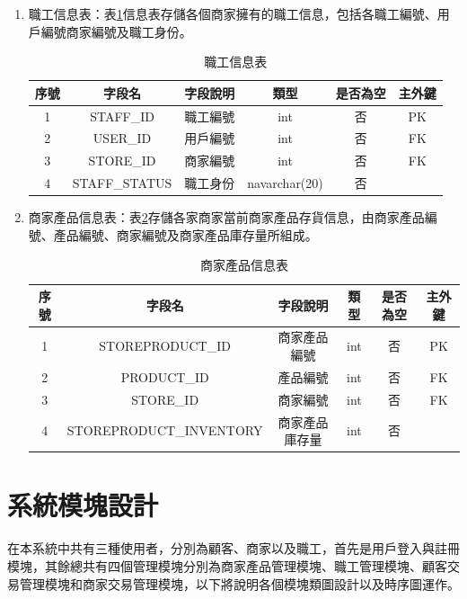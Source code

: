 \begin{enumerate}
		\item 職工信息表：表\ref{staff}信息表存儲各個商家擁有的職工信息，包括各職工編號、用戶編號商家編號及職工身份。
				\begin{table}[htbp]
				\centering
				\caption{職工信息表}
				\label{staff}
				\begin{tabular}{|c|c|c|c|c|c|}
				\hline
				序號 & 字段名 & 字段說明 & 類型 & 是否為空 & 主外鍵 \\ \hline
				1 & STAFF\_ID & 職工編號 & int & 否 & PK \\ \hline
				2 & USER\_ID & 用戶編號 & int & 否 & FK \\ \hline
				3 & STORE\_ID & 商家編號 & int & 否 & FK \\ \hline
				4 & STAFF\_STATUS & 職工身份 & navarchar(20) & 否 &  \\ \hline
				\end{tabular}
				\end{table}

		\item 商家產品信息表：表\ref{storeproduct}存儲各家商家當前商家產品存貨信息，由商家產品編號、產品編號、商家編號及商家產品庫存量所組成。
				\begin{table}[htbp]
				\centering
				\caption{商家產品信息表}
				\label{storeproduct}
				\begin{tabular}{|c|c|c|c|c|c|}
				\hline
				序號 & 字段名 & 字段說明 & 類型 & 是否為空 & 主外鍵 \\ \hline
				1 & STOREPRODUCT\_ID & 商家產品編號 & int & 否 & PK \\ \hline
				2 & PRODUCT\_ID & 產品編號 & int & 否 & FK \\ \hline
				3 & STORE\_ID & 商家編號 & int & 否 & FK \\ \hline
				4 & STOREPRODUCT\_INVENTORY & 商家產品庫存量 & int & 否 &  \\ \hline
				\end{tabular}
				\end{table}

	\end{enumerate}

\section{系統模塊設計}
在本系統中共有三種使用者，分別為顧客、商家以及職工，首先是用戶登入與註冊模塊，其餘總共有四個管理模塊分別為商家產品管理模塊、職工管理模塊、顧客交易管理模塊和商家交易管理模塊，以下將說明各個模塊類圖設計以及時序圖運作。

